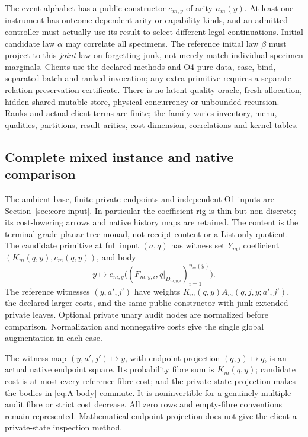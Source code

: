The event alphabet has a public constructor $e_{m,y}$ of arity $n_m(y)$.
At least one instrument has outcome-dependent arity or capability kinds,
and an admitted controller must actually use its result to select different
legal continuations. Initial candidate law $\alpha$ may correlate all
specimens. The reference initial law $\beta$ must project to this
\emph{joint} law on forgetting junk, not merely match individual
specimen marginals. Clients use the declared methods and O4 pure data,
case, bind, separated batch and ranked invocation; any extra primitive
requires a separate relation-preservation certificate. There is no
latent-quality oracle, fresh allocation, hidden shared mutable store,
physical concurrency or unbounded recursion. Ranks and actual client
terms are finite; the family varies inventory, menu, qualities, partitions,
result arities, cost dimension, correlations and kernel tables.

\subsection{Complete mixed instance and native comparison}
The ambient base, finite private endpoints and independent O1 inputs are
Section~\ref{sec:core-input}. In particular the coefficient rig is thin
but non-discrete; its cost-lowering arrows and native history maps are
retained. The content is the terminal-grade planar-tree monad, not receipt
content or a List-only quotient. The candidate primitive at full input
$(a,q)$ has witness set $Y_m$, coefficient $(K_m(q,y),c_m(q,y))$, and body
\begin{equation}\label{eq:A-body}
y\longmapsto e_{m,y}\bigl((F_{m,y,i},q|_{D_{m,y,i}})_{i=1}^{n_m(y)}\bigr).
\end{equation}
The reference witnesses $(y,a',j')$ have weights
$K_m(q,y)A_m(q,j,y;a',j')$, the declared larger costs, and the same
public constructor with junk-extended private leaves. Optional private
unary audit nodes are normalized before comparison. Normalization and
nonnegative costs give the single global augmentation in each case.

The witness map $(y,a',j')\mapsto y$, with endpoint projection
$(q,j)\mapsto q$, is an actual native endpoint square. Its probability
fibre sum is $K_m(q,y)$; candidate cost is at most every reference fibre
cost; and the private-state projection makes the bodies in
\eqref{eq:A-body} commute. It is noninvertible for a genuinely multiple
audit fibre or strict cost decrease. All zero rows and empty-fibre
conventions remain represented. Mathematical endpoint projection does
not give the client a private-state inspection method.

